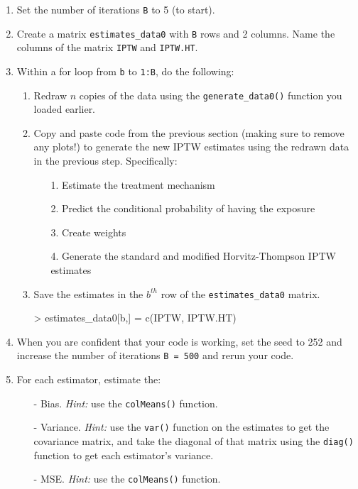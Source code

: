 \documentclass[answers]{exam}
\begin{document}
\begin{enumerate}
\begin{enumerate}
\item Set the number of iterations \texttt{B} to 5 (to start).
\item Create a matrix \texttt{estimates\_data0} with \texttt{B} rows and 2 columns. Name the columns of the matrix \texttt{IPTW} and \texttt{IPTW.HT}.
\item Within a for loop from \texttt{b} to \texttt{1:B}, do the following:
\begin{enumerate}
\item Redraw $n$ copies of the data using the \texttt{generate\_data0()} function you loaded earlier. 
\item Copy and paste code from the previous section (making sure to remove any plots!) to generate the new IPTW estimates using the redrawn data in the previous step. Specifically: 
\begin{enumerate}
\item[1.] Estimate the treatment mechanism
\item[2.] Predict the conditional probability of having the exposure
\item[3.] Create weights
\item[4.] Generate the standard and modified Horvitz-Thompson IPTW estimates
\end{enumerate}
\item Save the estimates in the $b^{th}$ row of the \texttt{estimates\_data0} matrix.
\begin{Schunk}
\begin{Sinput}
> estimates_data0[b,] = c(IPTW, IPTW.HT)
\end{Sinput}
\end{Schunk}
\end{enumerate}
\item When you are confident that your code is working, set the seed to 252 and increase the number of iterations \texttt{B = 500} and rerun your code.
\item For each estimator, estimate the:
\begin{itemize}
\item[-] Bias. \textit{Hint:} use the \texttt{colMeans()} function.
\item[-] Variance. \textit{Hint:} use the \texttt{var()} function on the estimates to get the covariance matrix, and take the diagonal of that matrix using the \texttt{diag()} function to get each estimator's variance.
\item[-] MSE. \textit{Hint:} use the \texttt{colMeans()} function.
\end{itemize}
\end{enumerate}
\end{enumerate}
\end{document}
